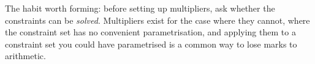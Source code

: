 \begin{exercisesolution}
\begin{remark}
The habit worth forming: before setting up multipliers, ask whether the constraints can be
\emph{solved}. Multipliers exist for the case where they cannot, where the constraint set has no
convenient parametrisation, and applying them to a constraint set you could have parametrised is
a common way to lose marks to arithmetic.
\end{remark}
\end{exercisesolution}

